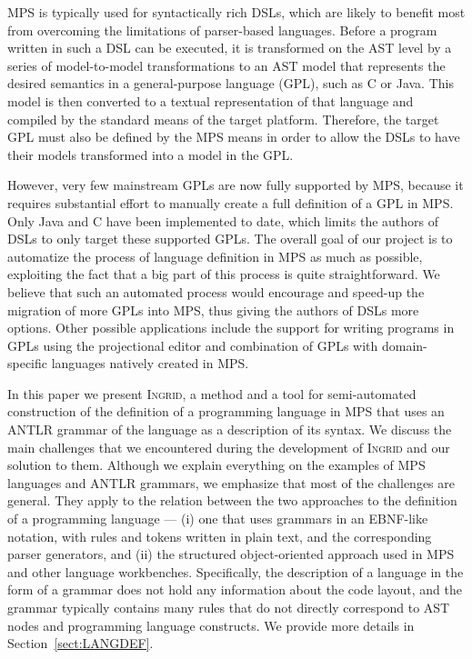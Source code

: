 MPS is typically used for syntactically rich DSLs, which are likely to benefit most from overcoming the limitations of parser-based languages.
Before a program written in such a DSL can be executed, it is transformed on the AST level by a series of model-to-model transformations to an AST model that represents the desired semantics in a general-purpose language (GPL), such as C or Java.
This model is then converted to a textual representation of that language and compiled by the standard means of the target platform.
Therefore, the target GPL must also be defined by the MPS means in order to allow the DSLs to have their models transformed into a model in the GPL.

However, very few mainstream GPLs are now fully supported by MPS, because it requires substantial effort to manually create a full definition of a GPL in MPS.
Only Java and C have been implemented to date, which limits the authors of DSLs to only target these supported GPLs.
The overall goal of our project is to automatize the process of language definition in MPS as much as possible, exploiting the fact that a big part of this process is quite straightforward.
We believe that such an automated process would encourage and speed-up the migration of more GPLs into MPS, thus giving the authors of DSLs more options.
Other possible applications include the support for writing programs in GPLs using the projectional editor and combination of GPLs with domain-specific languages natively created in MPS.

In this paper we present \textsc{Ingrid}, a method and a tool for semi-automated construction of the definition of a programming language in MPS that uses an ANTLR grammar of the language as a description of its syntax.
We discuss the main challenges that we encountered during the development of \textsc{Ingrid} and our solution to them.
Although we explain everything on the examples of MPS languages and ANTLR grammars, we emphasize that most of the challenges are general. 
They apply to the relation between the two approaches to the definition of a programming language --- (i) one that uses grammars in an EBNF-like notation, with rules and tokens written in plain text, and the corresponding parser generators, and (ii) the structured object-oriented approach used in MPS and other language workbenches.
Specifically, the description of a language in the form of a grammar does not hold any information about the code layout, and the grammar typically contains many rules that do not directly correspond to AST nodes and programming language constructs.
We provide more details in Section~\ref{sect:LANGDEF}.

